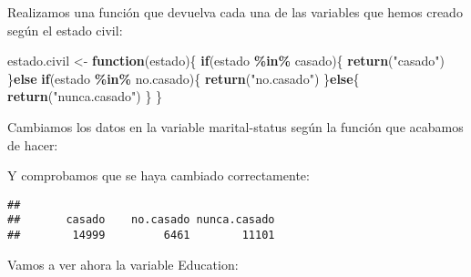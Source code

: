 \documentclass[]{article}
\newenvironment{Shaded}{\begin{snugshade}}{\end{snugshade}}
\newcommand{\ControlFlowTok}[1]{\textcolor[rgb]{0.13,0.29,0.53}{\textbf{#1}}}
\newcommand{\DataTypeTok}[1]{\textcolor[rgb]{0.13,0.29,0.53}{#1}}
\newcommand{\KeywordTok}[1]{\textcolor[rgb]{0.13,0.29,0.53}{\textbf{#1}}}
\newcommand{\NormalTok}[1]{#1}
\newcommand{\OperatorTok}[1]{\textcolor[rgb]{0.81,0.36,0.00}{\textbf{#1}}}
\newcommand{\StringTok}[1]{\textcolor[rgb]{0.31,0.60,0.02}{#1}}
\begin{document}
Realizamos una función que devuelva cada una de las variables que hemos
creado según el estado civil:

\begin{Shaded}
\begin{Highlighting}[]
\NormalTok{estado.civil \textless{}{-}}\StringTok{ }\ControlFlowTok{function}\NormalTok{(estado)\{}
  \ControlFlowTok{if}\NormalTok{(estado }\OperatorTok{\%in\%}\StringTok{ }\NormalTok{casado)\{}
    \KeywordTok{return}\NormalTok{(}\StringTok{"casado"}\NormalTok{)}
\NormalTok{  \}}\ControlFlowTok{else} \ControlFlowTok{if}\NormalTok{(estado }\OperatorTok{\%in\%}\StringTok{ }\NormalTok{no.casado)\{}
    \KeywordTok{return}\NormalTok{(}\StringTok{"no.casado"}\NormalTok{)}
\NormalTok{  \}}\ControlFlowTok{else}\NormalTok{\{}
    \KeywordTok{return}\NormalTok{(}\StringTok{"nunca.casado"}\NormalTok{)}
\NormalTok{  \}}
\NormalTok{\}}
\end{Highlighting}
\end{Shaded}

Cambiamos los datos en la variable marital-status según la función que
acabamos de hacer:

\begin{Shaded}
\end{Shaded}

Y comprobamos que se haya cambiado correctamente:

\begin{Shaded}
\end{Shaded}

\begin{verbatim}
## 
##       casado    no.casado nunca.casado 
##        14999         6461        11101
\end{verbatim}

Vamos a ver ahora la variable Education:
\end{document}
